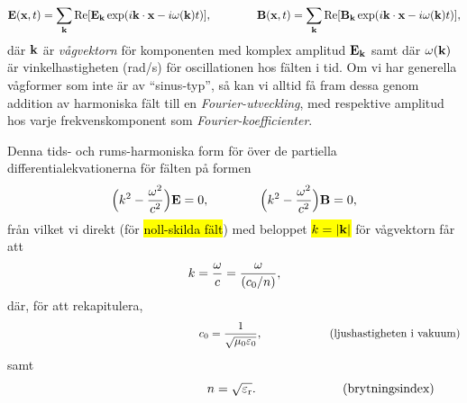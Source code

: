 \hl{$$
  {\bf E}({\bf x},t)=\sum_{\bf k}
     \Re[{\bf E}_{\bf k}\exp(i{\bf k}\cdot{\bf x}-i\omega({\bf k}) t)],
  \qquad\qquad
  {\bf B}({\bf x},t)=\sum_{\bf k}
     \Re[{\bf B}_{\bf k}\exp(i{\bf k}\cdot{\bf x}-i\omega({\bf k}) t)],
$$}
d{\"a}r ${\bf k}$ {\"a}r {\it v{\aa}gvektorn} f{\"o}r komponenten med komplex
amplitud ${\bf E}_{\bf k}$ samt d{\"a}r $\omega({\bf k})$ {\"a}r
vinkelhastigheten (rad/s) f{\"o}r oscillationen hos f{\"a}lten i tid.
Om vi har generella v{\aa}gformer som inte {\"a}r av ``sinus-typ'', s{\aa} kan
vi alltid f{\aa} fram dessa genom addition av harmoniska f{\"a}lt till en
{\it Fourier-utveckling}, med respektive amplitud hos varje frekvenskomponent
som {\it Fourier-koefficienter}.
\vfill\eject

Denna tids- och rums-harmoniska form f{\"o}r {\"o}ver de partiella
differentialekvationerna f{\"o}r f{\"a}lten p{\aa}
formen
\hl{$$
  \Big(k^2 - {{\omega^2}\over{c^2}}\Big) {\bf E} = 0,
  \qquad\qquad
  \Big(k^2 - {{\omega^2}\over{c^2}}\Big) {\bf B} = 0,
$$}
fr{\aa}n vilket vi direkt (f{\"o}r {\hl{noll-skilda f{\"a}lt}}) med beloppet
{\hl{$k=|{\bf k}|$}} f{\"o}r v{\aa}gvektorn f{\aa}r att
\hl{$$
  k = {{\omega}\over{c}}
    = {{\omega}\over{(c_0/n)}},
$$}
d{\"a}r, f{\"o}r att rekapitulera,
$$
  \hskip100pt\hphantom{ljushastigheten}
  c_0 = {{1}\over{\sqrt{\mu_0\varepsilon_0}}},
  \hskip60pt(\hbox{ljushastigheten i vakuum})
$$
samt
$$
  \hskip69pt\hphantom{brytningsindex}
  n = \sqrt{\varepsilon_{\rm r}}.
  \hskip69pt(\hbox{brytningsindex})
$$

